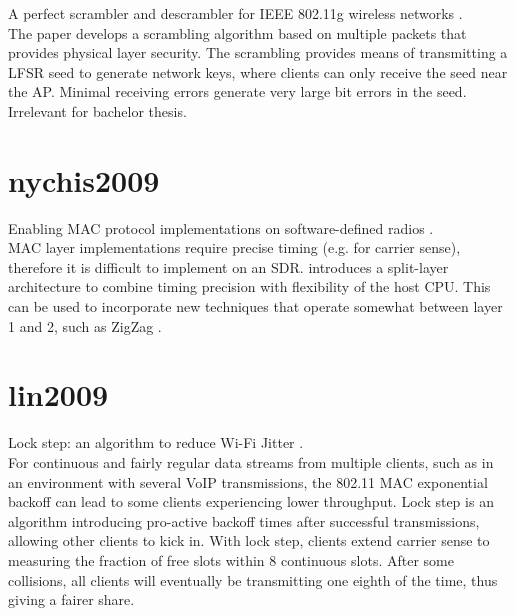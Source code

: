A perfect scrambler and descrambler for IEEE 802.11g wireless networks \cite{anitha2005}.\\

The paper develops a scrambling algorithm based on multiple packets that provides physical layer security. The scrambling provides means of transmitting a LFSR seed to generate network keys, where clients can only receive the seed near the AP. Minimal receiving errors generate very large bit errors in the seed. Irrelevant for bachelor thesis.



\section*{nychis2009}

Enabling MAC protocol implementations on software-defined radios \cite{nychis2009}.\\

MAC layer implementations require precise timing (e.g. for carrier sense), therefore it is difficult to implement on an SDR. \cite{nychis2009} introduces a split-layer architecture to combine timing precision with flexibility of the host CPU. This can be used to incorporate new techniques that operate somewhat between layer 1 and 2, such as ZigZag \cite{gollakota2008}.



\section*{lin2009}

Lock step: an algorithm to reduce Wi-Fi Jitter \cite{lin2009}.\\

For continuous and fairly regular data streams from multiple clients, such as in an environment with several VoIP transmissions, the 802.11 MAC exponential backoff can lead to some clients experiencing lower throughput. Lock step is an algorithm introducing pro-active backoff times after successful transmissions, allowing other clients to kick in. With lock step, clients extend carrier sense to measuring the fraction of free slots within 8 continuous slots. After some collisions, all clients will eventually be transmitting one eighth of the time, thus giving a fairer share.



